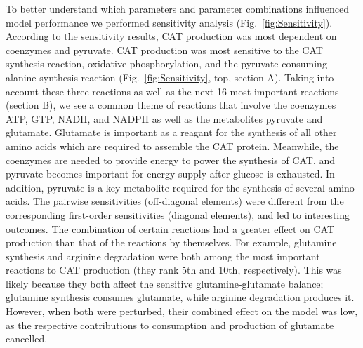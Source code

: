 \documentclass[12pt]{article}
\begin{document}
To better understand which parameters and parameter combinations influenced model performance we performed sensitivity analysis (Fig.~\ref{fig:Sensitivity}).
According to the sensitivity results, CAT production was most dependent on coenzymes and pyruvate.
CAT production was most sensitive to the CAT synthesis reaction, oxidative phosphorylation, and the pyruvate-consuming alanine synthesis reaction (Fig.~\ref{fig:Sensitivity}, top, section A). 
Taking into account these three reactions as well as the next 16 most important reactions (section B), we see a common theme of reactions that involve the coenzymes ATP, GTP, NADH, and NADPH as well as the metabolites pyruvate and glutamate.
Glutamate is important as a reagant for the synthesis of all other amino acids which are required to assemble the CAT protein. 
Meanwhile, the coenzymes are needed to provide energy to power the synthesis of CAT, and pyruvate becomes important for energy supply after glucose is exhausted.  
In addition, pyruvate is a key metabolite required for the synthesis of several amino acids. 
The pairwise sensitivities (off-diagonal elements) were different from the corresponding first-order sensitivities (diagonal elements), and led to interesting outcomes.
The combination of certain reactions had a greater effect on CAT production than that of the reactions by themselves.  
For example, glutamine synthesis and arginine degradation were both among the most important reactions to CAT production (they rank 5th and 10th, respectively).
This was likely because they both affect the sensitive glutamine-glutamate balance; glutamine synthesis consumes glutamate, while arginine degradation produces it.
However, when both were perturbed, their combined effect on the model was low, as the respective contributions to consumption and production of glutamate cancelled.
\end{document}
